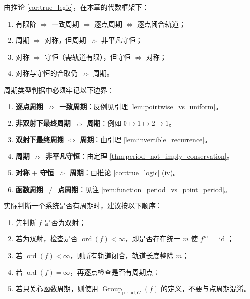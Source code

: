 \begin{corollary}[周期、对称、守恒的逻辑图]\label{cor:period_symmetry_conservation_logic_review}
由推论 \ref{cor:true_logic}，在本章的代数框架下：
\begin{enumerate}[label=(\roman*)]
    \item 有限阶 \(\Rightarrow\) 一致周期 \(\Rightarrow\) 逐点周期 \(\iff\) 逐点闭合轨道；
    \item 周期 \(\Rightarrow\) 对称，但周期 \(\nRightarrow\) 非平凡守恒；
    \item 对称 \(\Rightarrow\) 守恒（需轨道有限），但守恒 \(\nRightarrow\) 对称；
    \item 对称与守恒的合取仍 \(\nRightarrow\) 周期。
\end{enumerate}
\end{corollary}

\begin{remark}[关键边界]\label{rem:period_type_boundaries}
周期类型判据中必须牢记以下边界：
\begin{enumerate}[label=(\roman*)]
    \item \textbf{逐点周期 \(\nRightarrow\) 一致周期}：反例见引理 \ref{lem:pointwise_vs_uniform}。
    \item \textbf{非双射下最终周期 \(\nRightarrow\) 周期}：例如 \(0\mapsto 1\mapsto 2\mapsto 1\)。
    \item \textbf{双射下最终周期 \(\iff\) 周期}：由引理 \ref{lem:invertible_recurrence}。
    \item \textbf{周期 \(\nRightarrow\) 非平凡守恒}：由定理 \ref{thm:period_not_imply_conservation}。
    \item \textbf{对称 \(+\) 守恒 \(\nRightarrow\) 周期}：由推论 \ref{cor:true_logic} (iv)。
    \item \textbf{函数周期 \(\neq\) 点周期}：见注 \ref{rem:function_period_vs_point_period}。
\end{enumerate}
\end{remark}

\begin{remark}[判据的使用顺序]\label{rem:how_to_use_period_criteria}
实际判断一个系统是否有周期时，建议按以下顺序：
\begin{enumerate}[label=(\arabic*)]
    \item 先判断 \(f\) 是否为双射；
    \item 若为双射，检查是否 \(\operatorname{ord}(f)<\infty\)，即是否存在统一 \(m\) 使 \(f^m=\operatorname{id}\)；
    \item 若 \(\operatorname{ord}(f)<\infty\)，则所有轨道闭合，轨道长度整除 \(m\)；
    \item 若 \(\operatorname{ord}(f)=\infty\)，再逐点检查是否有周期点；
    \item 若只关心函数周期，则使用 \(\operatorname{Group}_{\mathrm{period},G}(f)\) 的定义，不要与点周期混淆。
\end{enumerate}
\end{remark}

